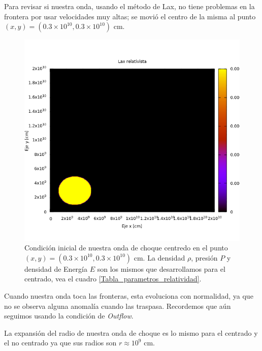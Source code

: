\documentclass[12pt,a4paper]{book}
\begin{document}
Para revisar si nuestra onda, usando el método de Lax, no tiene problemas en la frontera por usar velocidades muy altas; se movió el centro de la misma al punto $(x,y) = (0.3 \times 10^{10}, 0.3 \times 10^{10})$ cm.

\begin{figure}[H]
\centering
\includegraphics[scale=0.5]{./Figuras/Pruebas/Prueba_onda_choque/Lax-HLL-rel/bwlax-rel0-no-centrado}
\caption{Condición inicial de nuestra onda de choque centredo en el punto $(x,y) = (0.3 \times 10^{10}, 0.3 \times 10^{10})$ cm. La densidad $\rho$, presión $P$ y densidad de Energía $E$ son los mismos que desarrollamos para el centrado, vea el cuadro \ref{Tabla_parametros_relatividad}.} \label{fig:bwlax-rel-no-centrado}
\end{figure}

Cuando nuestra onda toca las fronteras, esta evoluciona con normalidad, ya que no se observa alguna anomalía cuando las traspasa. Recordemos que aún seguimos usando la condición de \emph{Outflow}.

La expansión del radio de nuestra onda de choque es lo mismo para el centrado y el no centrado ya que sus radios son $r \approx 10^{9}$ cm.
\end{document}
